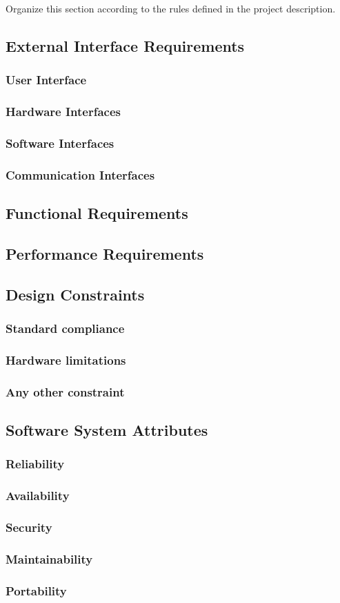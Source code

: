 Organize this section according to the rules defined in the project description. 
\subsection{External Interface Requirements}
\subsubsection{User Interface}
\subsubsection{Hardware Interfaces}
\subsubsection{Software Interfaces}
\subsubsection{Communication Interfaces}
\subsection{Functional Requirements}
\subsection{Performance Requirements}
\subsection{Design Constraints}
\subsubsection{Standard compliance}
\subsubsection{Hardware limitations}
\subsubsection{Any other constraint}
\subsection{Software System Attributes}
\subsubsection{Reliability}
\subsubsection{Availability}
\subsubsection{Security}
\subsubsection{Maintainability}
\subsubsection{Portability}
